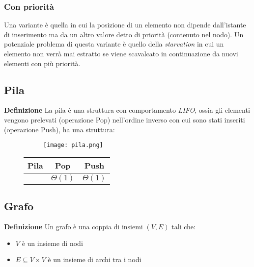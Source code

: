 \documentclass{article}
\begin{document}
\subsubsection{Con priorità}

Una variante è quella in cui la posizione di un elemento non dipende dall'istante di inserimento ma da un altro valore detto di priorità (contenuto nel nodo). Un potenziale problema di questa variante è quello della \textit{starvation} in cui un elemento non verrà mai estratto se viene scavalcato in continuazione da nuovi elementi con più priorità.

\subsection{Pila}

\textbf{Definizione} La pila è una struttura con comportamento \textit{LIFO}, ossia gli elementi vengono prelevati (operazione Pop) nell'ordine inverso con cui sono stati inseriti (operazione Push), ha una struttura:

\begin{figure}[ht]
\begin{minipage}[t]{0.49\textwidth}
\begin{figure}[H]
    \centering
    \texttt{[image: pila.png]}
    \label{fig:pila}
\end{figure}
\end{minipage}
\begin{minipage}[t]{0.49\textwidth}
\begin{table}[H]
    \centering
    \begin{tabular}{c|c|c}
        Pila & Pop & Push\\
        \hline
         & $\Theta(1)$ & $\Theta(1)$\\
    \end{tabular}
    \label{tab:costo_pila}
\end{table}
\end{minipage}
\end{figure}

\subsection{Grafo}

\textbf{Definizione} Un grafo è una coppia di insiemi $(V,E)$ tali che:
\begin{itemize}
    \item $V$ è un insieme di nodi
    \item $E\subseteq V\times V$ è un insieme di archi tra i nodi\newline
\end{itemize}
\end{document}
